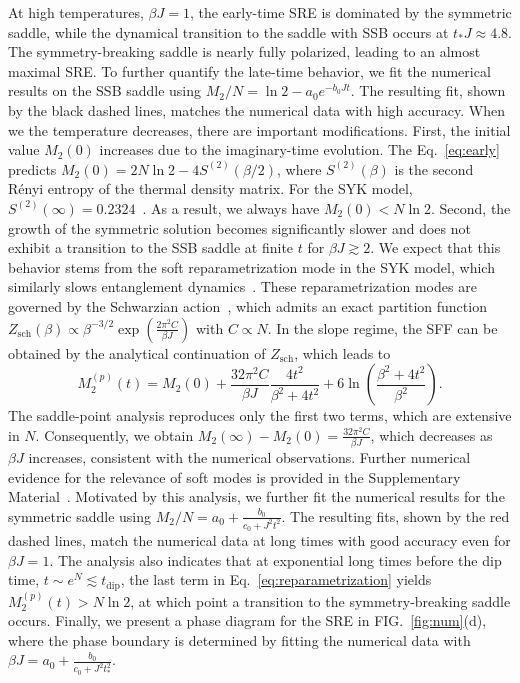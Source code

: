 \documentclass[aps,prl,twocolumn,superscriptaddress,longbibliography]{revtex4-2}
\begin{document}
 At high temperatures, $\beta J = 1$, the early-time SRE is dominated by the symmetric saddle, while the dynamical transition to the saddle with SSB occurs at $t_* J \approx 4.8$. The symmetry-breaking saddle is nearly fully polarized, leading to an almost maximal SRE. To further quantify the late-time behavior, we fit the numerical results on the SSB saddle using $M_2/N = \ln 2 - a_0 e^{-b_0 J t}$. The resulting fit, shown by the black dashed lines, matches the numerical data with high accuracy. When we the temperature decreases, there are important modifications. First, the initial value $M_2(0)$ increases due to the imaginary-time evolution. The Eq.~\eqref{eq:early} predicts $M_2(0)=2N\ln 2-4S^{(2)}(\beta/2)$, where $S^{(2)}(\beta)$ is the second R\'enyi entropy of the thermal density matrix. For the SYK model, $S^{(2)}(\infty)=0.2324$~\cite{maldacena2016remarks}. As a result, we always have $M_2(0)<N\ln 2$. Second, the growth of the symmetric solution becomes significantly slower and does not exhibit a transition to the SSB saddle at finite $t$ for $\beta J \gtrsim 2$. We expect that this behavior stems from the soft reparametrization mode in the SYK model, which similarly slows entanglement dynamics~\cite{Gu:2017njx,Sohal:2021djw}. These reparametrization modes are governed by the Schwarzian action~\cite{maldacena2016remarks}, which admits an exact partition function~\cite{Stanford:2017thb} $Z_\text{sch}(\beta)\propto \beta^{-3/2}\exp(\frac{2\pi^2 C}{ \beta J})$ with $C\propto N$. In the slope regime, the SFF can be obtained by the analytical continuation of $Z_\text{sch}$, which leads to
 \begin{equation}\label{eq:reparametrization}
  M_2^{(p)}(t)=M_2(0)+\frac{32\pi^2 C}{ \beta J}\frac{4t^2}{{\beta^2}+4t^2}+6\ln\left(\frac{{\beta^2}+4t^2}{\beta^2}\right).
 \end{equation}
 The saddle-point analysis reproduces only the first two terms, which are extensive in $N$. Consequently, we obtain $M_2(\infty)-M_2(0)=\frac{32\pi^2 C}{\beta J}$,
which decreases as $\beta J$ increases, consistent with the numerical observations. Further numerical evidence for the relevance of soft modes is provided in the Supplementary Material~\cite{SM}. Motivated by this analysis, we further fit the numerical results for the symmetric saddle using $M_2/N = a_0 + \frac{b_0}{c_0 + J^2t^2}$. The resulting fits, shown by the red dashed lines, match the numerical data at long times with good accuracy even for $\beta J=1$. The analysis also indicates that at exponential long times before the dip time, $t \sim e^{N}\lesssim t_{\text{dip}}$, the last term in Eq.~\eqref{eq:reparametrization} yields $M_2^{(p)}(t) > N\ln 2$, at which point a transition to the symmetry-breaking saddle occurs. Finally, we present a phase diagram for the SRE in FIG.~\ref{fig:num}(d), where the phase boundary is determined by fitting the numerical data with $\beta J=a_0+\frac{b_0}{c_0+J^2t_*^2}$.
\end{document}
